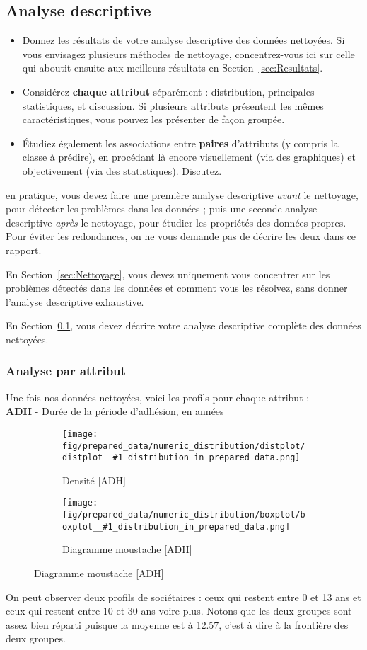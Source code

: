\documentclass{ceri/sty/rapport}
\newcommand{\figureDistribution}[1]{
\begin{figure}[H]
    \centering
    \begin{subfigure}[t]{0.49\textwidth}
        \texttt{[image: fig/prepared\_data/numeric\_distribution/distplot/distplot\_\_\#1\_distribution\_in\_prepared\_data.png]}
        \caption{Densité [#1]}
        \label{fig:#1_density}
    \end{subfigure}
    \hfill
    \begin{subfigure}[t]{0.49\textwidth}
        \texttt{[image: fig/prepared\_data/numeric\_distribution/boxplot/boxplot\_\_\#1\_distribution\_in\_prepared\_data.png]}
        \caption{Diagramme moustache [#1]}
        \label{fig:#1_boxplot}
    \end{subfigure}
    \label{fig:#1_distribution}
\end{figure}
}
\newcommand{\inputDescription}[1]{
\begin{center}

\end{center}
}
\begin{document}
\subsection{Analyse descriptive}
\label{sec:AnalyseDesc}
\begin{itemize}
	\item Donnez les résultats de votre analyse descriptive des données nettoyées. Si vous envisagez plusieurs méthodes de nettoyage, concentrez-vous ici sur celle qui aboutit ensuite aux meilleurs résultats en Section~\ref{sec:Resultats}.
	\item Considérez \textbf{chaque attribut} séparément : distribution, principales statistiques, et discussion. Si plusieurs attributs présentent les mêmes caractéristiques, vous pouvez les présenter de façon groupée.
	\item Étudiez également les associations entre \textbf{paires} d'attributs (y compris la classe à prédire), en procédant là encore visuellement (via des graphiques) et objectivement (via des statistiques). Discutez.
\end{itemize}

\begin{beware}[Remarque]
en pratique, vous devez faire une première analyse descriptive \textit{avant} le nettoyage, pour détecter les problèmes dans les données ; puis une seconde analyse descriptive \textit{après} le nettoyage, pour étudier les propriétés des données propres. Pour éviter les redondances, on ne vous demande pas de décrire les deux dans ce rapport.

En Section~\ref{sec:Nettoyage}, vous devez uniquement vous concentrer sur les problèmes détectés dans les données et comment vous les résolvez, sans donner l'analyse descriptive exhaustive.

En Section~\ref{sec:AnalyseDesc}, vous devez décrire votre analyse descriptive complète des données nettoyées.
\end{beware}

\subsubsection{Analyse par attribut}
Une fois nos données nettoyées, voici les profils pour chaque attribut :\\


\textbf{ADH} - Durée de la période d’adhésion, en années
\figureDistribution{ADH}
\inputDescription{ADH}
On peut observer deux profils de sociétaires : ceux qui restent entre 0 et 13 ans et ceux qui restent entre 10 et 30 ans voire plus.
Notons que les deux groupes sont assez bien réparti puisque la moyenne est à 12.57, c'est à dire à la frontière des deux groupes.\\
\end{document}
